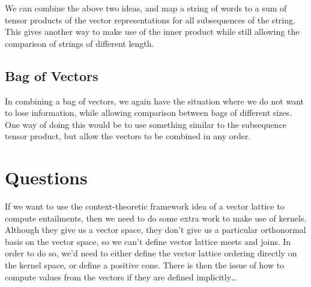 \documentclass{article}
\begin{document}
We can combine the above two ideas, and map a string of words to a sum
of tensor products of the vector representations for all subsequences
of the string. This gives another way to make use of the inner product
while still allowing the comparison of strings of different length.

\subsection*{Bag of Vectors}

In combining a bag of vectors, we again have the situation where we
do not want to lose information, while allowing comparison between
bags of different sizes. One way of doing this would be to use
something similar to the subsequence tensor product, but allow the
vectors to be combined in any order.

\section{Questions}

If we want to use the context-theoretic framework idea of a vector
lattice to compute entailments, then we need to do some extra work to
make use of kernels. Although they give us a vector space, they don't
give us a particular orthonormal basis on the vector space, so we
can't define vector lattice meets and joins. In order to do so, we'd
need to either define the vector lattice ordering directly on the
kernel space, or define a positive cone. There is then the issue of
how to compute values from the vectors if they are defined
implicitly\ldots

%

%
\end{document}
